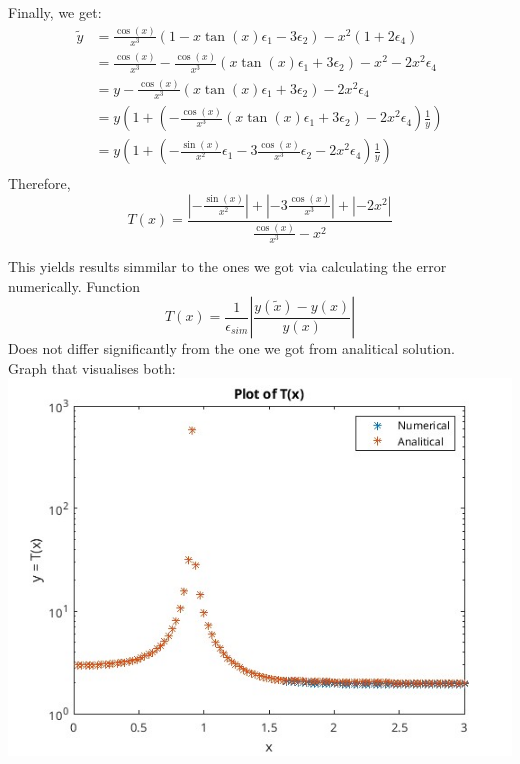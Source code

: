 \documentclass[11pt]{article}
\begin{document}
Finally, we get:
\begin{align*}
\tilde{y}&=\frac{\cos(x)}{x^3}(1 - x\tan(x) \epsilon_1 - 3\epsilon_2)-x^2(1+2\epsilon_4)\\
    &=\frac{\cos(x)}{x^3}-\frac{\cos(x)}{x^3}(x\tan(x) \epsilon_1 + 3\epsilon_2)-x^2-2x^2\epsilon_4 \\
    &=y-\frac{\cos(x)}{x^3}(x\tan(x) \epsilon_1 + 3\epsilon_2)-2x^2\epsilon_4\\
    &=y(1 + (-\frac{\cos(x)}{x^3}(x\tan(x) \epsilon_1 + 3\epsilon_2)-2x^2\epsilon_4)\frac1y)\\
    &=y(1 + (-\frac{\sin(x)}{x^2}\epsilon_1 - 3\frac{\cos(x)}{x^3}\epsilon_2 - 2x^2\epsilon_4)\frac1y)\\
\end{align*}
Therefore, 
$$T(x) = \displaystyle\frac{
\left|-\frac{\sin(x)}{x^2}\right| +
\left|- 3\frac{\cos(x)}{x^3}\right| +
\left|-2x^2\right|
}
{\frac{\cos(x)}{x^3} - x^2}$$

This yields results simmilar to the ones we got via calculating the error numerically.
Function $$T(x) = \frac{1}{\epsilon_{sim}}\left| \displaystyle\frac{y(\tilde{x}) - y(x)}{y(x)} \right|$$
Does not differ significantly from the one we got from analitical solution.\\
Graph that visualises both:\\
\includegraphics[width=\textwidth]{Task1.jpg}
\end{document}
